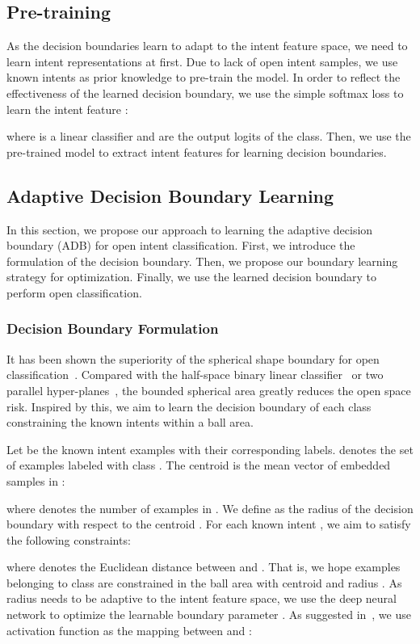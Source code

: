 \documentclass[letterpaper]{article} \usepackage{aaai21}  \usepackage{times}  \usepackage{helvet} \usepackage{courier}  \usepackage[hyphens]{url}  \usepackage{graphicx} \urlstyle{rm} \def\UrlFont{\rm}  \usepackage{natbib}  \usepackage{caption} \frenchspacing  \setlength{\pdfpagewidth}{8.5in}  \setlength{\pdfpageheight}{11in}  \usepackage{amsmath}
\begin{document}
	\subsection{Pre-training}
	As the decision boundaries learn to adapt to the intent feature space, we need to learn intent representations at first. Due to lack of open intent samples, we use known intents as prior knowledge to pre-train the model. In order to reflect the effectiveness of the learned decision boundary, we  use the simple softmax loss  to learn the intent feature :
	
	where  is a linear classifier and  are the output logits of the  class. Then, we use the pre-trained model to extract intent features for learning decision boundaries. 
	
	\subsection{Adaptive Decision Boundary Learning}
	In this section, we propose our approach to learning the adaptive decision boundary (ADB) for open intent classification. First, we introduce the formulation of the decision boundary. Then, we propose our boundary learning strategy for optimization. Finally, we use the learned decision boundary to perform open classification.  
	
	\subsubsection{Decision Boundary Formulation}
	It has been shown the superiority of the spherical shape boundary for open classification~\cite{fei-liu-2016-breaking}. Compared with the half-space binary linear classifier~\cite{scholkopf2001estimating} or two parallel hyper-planes~\cite{scheirer2013toward}, the bounded spherical area greatly reduces the open space risk. Inspired by this, we aim to learn the decision boundary of each class constraining the known intents within a ball area.
	
	Let  be the known intent examples with their corresponding labels.  denotes the set of examples labeled with class . The centroid  is the mean vector of embedded samples in :
	
	where  denotes the number of examples in . We define  as the radius of the decision boundary with respect to the centroid . For each known intent , we aim to satisfy the following constraints:
	
	where  denotes the Euclidean distance between  and . That is, we hope examples belonging to class  are constrained in the ball area with centroid  and radius . As radius  needs to be adaptive to the intent feature space, we use the deep neural network to optimize 
	the learnable boundary parameter . As suggested in~\cite{tapaswi2019video}, we use  activation function as the mapping between  and :
	
\end{document}
